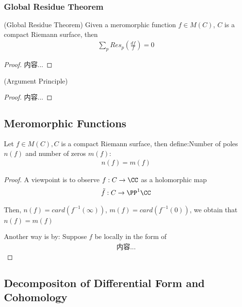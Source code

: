 \documentclass[Total.tex]{subfiles}
\begin{document}
				\subsubsection{Global Residue Theorem}
					\begin{theorem}
						(Global Residue Theorem) Given a meromorphic function $f\in M(C)$, $C$ is a compact Riemann surface, then
						\begin{gather*}
							\sum_p Res_p(\frac{df}{f})=0
						\end{gather*}
					\end{theorem}
					\begin{proof}
						内容...
					\end{proof}
					
					
					
					\begin{corollary}
						(Argument Principle)
					\end{corollary}
					\begin{proof}
						内容...
					\end{proof}
			\subsection{Meromorphic Functions}
				\begin{proposition}
					Let $f\in M(C),C$ is a compact Riemann surface, then define:Number of poles $n(f)$ and number of zeros $m(f)$:
					\begin{gather*}
						n(f)=m(f)
					\end{gather*}
				\end{proposition}
				\begin{proof}
					A viewpoint is to observe $f:C\rightarrow \CC$ as a holomorphic map 
					\begin{gather*}
						\tilde{f}:C\rightarrow \PP^1\CC
					\end{gather*}
					
					Then, $n(f)=card(f^{-1}(\infty))$, $m(f)=card(f^{-1}(0))$, we obtain that $n(f)=m(f)$
					
					Another way is by: Suppose $f$ be locally in the form of
					\begin{gather*}
						内容...
					\end{gather*}
				\end{proof}
			\subsection{Decompositon of Differential Form and Cohomology}
\end{document}
